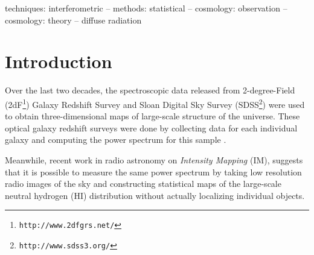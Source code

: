 \documentclass[fleqn,usenatbib]{mnras}
\begin{document}
\begin{keywords}
techniques:  interferometric -- methods: statistical -- cosmology: observation -- cosmology: theory -- diffuse radiation
\end{keywords}





\section{Introduction} \label{sec:intro}

Over the last two decades, the spectroscopic data released from 2-degree-Field (2dF\footnote{{\tt http://www.2dfgrs.net/}}) Galaxy Redshift Survey and Sloan Digital Sky Survey (SDSS\footnote{{\tt http://www.sdss3.org/}}) were used to obtain three-dimensional maps of large-scale structure of the universe. These optical galaxy redshift surveys were done by collecting data for each individual galaxy and computing the power spectrum for this sample \citep{1995ApJ...446..457S,1996ApJ...461...38S,2009astro2010S.234P}. 

Meanwhile, recent work in radio astronomy \citep{2015aska.confE..35W,2014MNRAS.441.3271W,2008Tzu,2008PhRvL.100p1301L,2015arXiv150103989S} on \emph{Intensity Mapping} (IM), suggests that it is possible to measure the same power spectrum by taking low resolution radio images of the sky and constructing statistical maps of the large-scale neutral hydrogen (HI) distribution without actually localizing individual objects.
\end{document}
